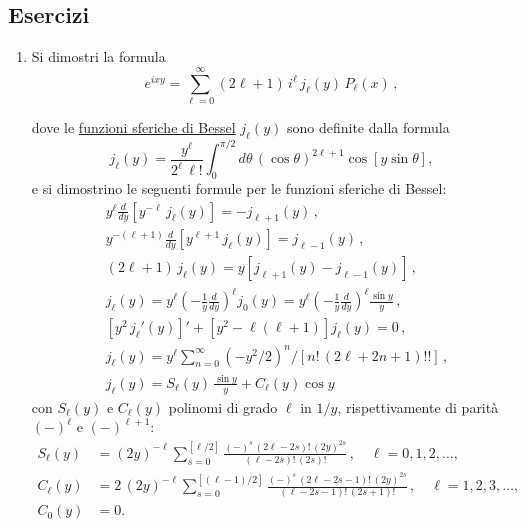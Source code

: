 \documentclass[11pt, a4paper]{book}
\numberwithin{equation}{section}
\newenvironment{esercizi}{\subsection*{Esercizi}\begin{enumerate}}{\end{enumerate}}
\begin{document}
\begin{esercizi}
\begin{enumerate}
\item Si dimostri la formula
\[
e^{ixy} = \sum_{\ell=0}^{\infty}(2\ell+1)\,i^\ell\,j_\ell(y)\,P_\ell(x)\,,
\]

dove le \uline{funzioni sferiche di Bessel} $j_\ell(y)$ sono definite dalla formula
\[
j_\ell(y) = \frac{y^\ell}{2^\ell\,\ell!}\int_0^{\pi/2}d\theta\,(\cos\theta)^{2\ell+1}\cos[y\sin\theta],
\]
e si dimostrino le seguenti formule per le funzioni sferiche di Bessel:
\begin{align*}
&y^\ell\frac{d}{dy}\left[y^{-\ell}\,j_\ell(y)\right] = -j_{\ell+1}(y)\,,\\
&y^{-(\ell+1)}\frac{d}{dy}\left[y^{\ell+1}\,j_\ell(y)\right] = j_{\ell-1}(y)\,,\\
&(2\ell+1)\,j_\ell(y) = y\left[j_{\ell+1}(y)-j_{\ell-1}(y)\right]\,,\\
&j_\ell(y) = y^\ell\left(-\frac{1}{y}\frac{d}{dy}\right)^\ell j_0(y)
= y^\ell\left(-\frac{1}{y}\frac{d}{dy}\right)^\ell\frac{\sin y}{y}\,,\\
&\left[y^2\,j_\ell'(y)\right]' + \left[y^2 - \ell(\ell+1)\right]j_\ell(y) = 0\,,\\
&j_\ell(y) = y^\ell\sum_{n=0}^{\infty}(-y^2/2)^n\Big/\left[n!\,(2\ell+2n+1)!!\right]\,,\\
&j_\ell(y) = S_\ell(y)\,\frac{\sin y}{y} + C_\ell(y)\cos y
\end{align*}
con $S_\ell(y)$ e $C_\ell(y)$ polinomi di grado $\ell$ in $1/y$, rispettivamente di parità $(-)^\ell$ e $(-)^{\ell+1}$:
\begin{align*}
S_\ell(y) &= (2y)^{-\ell}\sum_{s=0}^{[\ell/2]}\frac{(-)^s\,(2\ell-2s)!\,(2y)^{2s}}{(\ell-2s)!\,(2s)!}\,, \quad \ell=0,1,2,\ldots,\\
C_\ell(y) &= 2\,(2y)^{-\ell}\sum_{s=0}^{[(\ell-1)/2]}\frac{(-)^s\,(2\ell-2s-1)!\,(2y)^{2s}}{(\ell-2s-1)!\,(2s+1)!}\,, \quad \ell=1,2,3,\ldots,\\
C_0(y) &= 0.
\end{align*}


\end{enumerate}
\end{esercizi}
\end{document}

